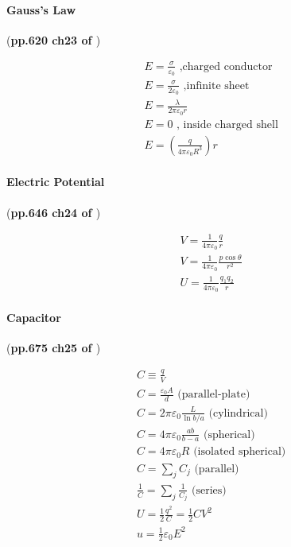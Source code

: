 \documentclass{article}
\numberwithin{equation}{subsection} %
\theoremstyle{definition}
\begin{document}
\paragraph{Gauss's Law} (\textbf{pp.620 ch23 of \cite{book}})

\begin{align}
    & E = \frac{\sigma}{\varepsilon_0}\text{ ,charged conductor} \\
    & E = \frac{\sigma}{2\varepsilon_0}\text{ ,infinite sheet} \\
    & E = \frac{\lambda}{2\pi\varepsilon_0 r} \\
    & E = 0 \text{ , inside charged shell} \\
    & E = \left(\frac{q}{4\pi\varepsilon_0 R^3}\right) r
\end{align}

\paragraph{Electric Potential} (\textbf{pp.646 ch24 of \cite{book}})

\begin{align}
    & V = \frac{1}{4\pi\varepsilon_0}\frac{q}{r} \\
    & V = \frac{1}{4\pi\varepsilon_0}\frac{p\cos\theta}{r^2} \\
    & U = \frac{1}{4\pi\varepsilon_0}\frac{q_1 q_2}{r}
\end{align}

\paragraph{Capacitor} (\textbf{pp.675 ch25 of \cite{book}})

\begin{align}
    & C \equiv \frac{q}{V} \\
    & C = \frac{\varepsilon_0 A}{d} \text{ (parallel-plate)} \\
    & C = 2\pi \varepsilon_0 \frac{L}{\ln{b/a}} 
            \text{ (cylindrical)}\\
    & C = 4\pi \varepsilon_0 \frac{ab}{b-a} \text{ (spherical)}\\
    & C = 4\pi \varepsilon_0 R \text{ (isolated spherical)} \\
    & C = \sum_j C_j \text{ (parallel)} \\
    & \frac{1}{C} = \sum_j \frac{1}{C_j} \text{ (series)}  \\
    & U = \frac{1}{2}\frac{q^2}{C} = \frac{1}{2}CV^2 \\
    & u = \frac{1}{2}\varepsilon_0 E^2
\end{align}
\end{document}

